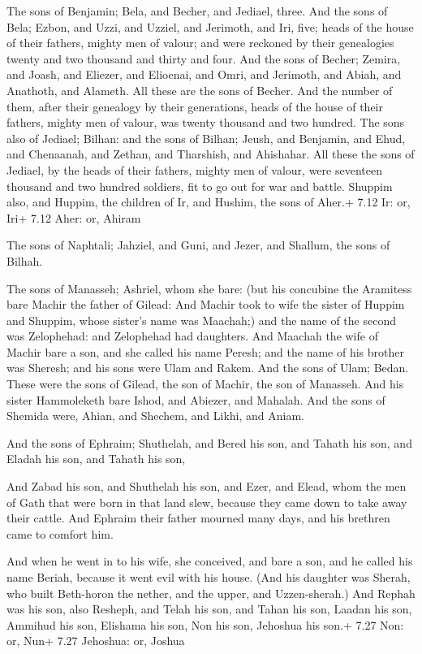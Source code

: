  The sons of Benjamin; Bela, and Becher, and Jediael,
three.  And the sons of Bela; Ezbon, and Uzzi, and Uzziel,
and Jerimoth, and Iri, five; heads of the house of their fathers, mighty
men of valour; and were reckoned by their genealogies twenty and two
thousand and thirty and four.  And the sons of Becher;
Zemira, and Joash, and Eliezer, and Elioenai, and Omri, and Jerimoth,
and Abiah, and Anathoth, and Alameth. All these are the sons of Becher.
 And the number of them, after their genealogy by their
generations, heads of the house of their fathers, mighty men of valour,
was twenty thousand and two hundred.  The sons also of
Jediael; Bilhan: and the sons of Bilhan; Jeush, and Benjamin, and Ehud,
and Chenaanah, and Zethan, and Tharshish, and Ahishahar. 
All these the sons of Jediael, by the heads of their fathers, mighty men
of valour, were seventeen thousand and two hundred soldiers, fit to go
out for war and battle.  Shuppim also, and Huppim, the
children of Ir, and Hushim, the sons of Aher.+ 7.12 Ir: or, Iri+ 7.12
Aher: or, Ahiram

 The sons of Naphtali; Jahziel, and Guni, and Jezer, and
Shallum, the sons of Bilhah.

 The sons of Manasseh; Ashriel, whom she bare: (but his
concubine the Aramitess bare Machir the father of Gilead: 
And Machir took to wife the sister of Huppim and Shuppim, whose sister's
name was Maachah;) and the name of the second was Zelophehad: and
Zelophehad had daughters.  And Maachah the wife of Machir
bare a son, and she called his name Peresh; and the name of his brother
was Sheresh; and his sons were Ulam and Rakem.  And the
sons of Ulam; Bedan. These were the sons of Gilead, the son of Machir,
the son of Manasseh.  And his sister Hammoleketh bare
Ishod, and Abiezer, and Mahalah.  And the sons of Shemida
were, Ahian, and Shechem, and Likhi, and Aniam.

 And the sons of Ephraim; Shuthelah, and Bered his son,
and Tahath his son, and Eladah his son, and Tahath his son,

 And Zabad his son, and Shuthelah his son, and Ezer, and
Elead, whom the men of Gath that were born in that land slew, because
they came down to take away their cattle.  And Ephraim
their father mourned many days, and his brethren came to comfort him.

 And when he went in to his wife, she conceived, and bare
a son, and he called his name Beriah, because it went evil with his
house.  (And his daughter was Sherah, who built Beth-horon
the nether, and the upper, and Uzzen-sherah.)  And Rephah
was his son, also Resheph, and Telah his son, and Tahan his son,
 Laadan his son, Ammihud his son, Elishama his son,
 Non his son, Jehoshua his son.+ 7.27 Non: or, Nun+ 7.27
Jehoshua: or, Joshua


